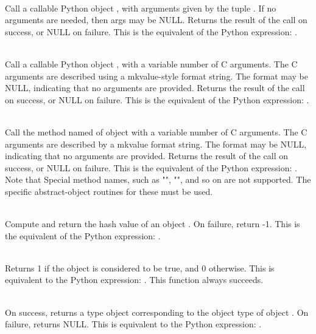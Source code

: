      \\
	 Call a callable Python object , with
	 arguments given by the tuple .  If no arguments are
	 needed, then args may be NULL.  Returns the result of the
	 call on success, or NULL on failure.  This is the equivalent
	 of the Python expression: .

     \\
         Call a callable Python object , with a
         variable number of C arguments. The C arguments are described
         using a mkvalue-style format string. The format may be NULL,
         indicating that no arguments are provided.  Returns the
         result of the call on success, or NULL on failure.  This is
         the equivalent of the Python expression: .


     \\
         Call the method named  of object  with a variable number of
         C arguments.  The C arguments are described by a mkvalue
         format string.  The format may be NULL, indicating that no
         arguments are provided. Returns the result of the call on
         success, or NULL on failure.  This is the equivalent of the
         Python expression: .
         Note that Special method names, such as "",
         "", and so on are not supported. The specific
         abstract-object routines for these must be used.


     \\
         Compute and return the hash value of an object .  On
         failure, return -1.  This is the equivalent of the Python
         expression: .


     \\
	 Returns 1 if the object  is considered to be true, and
	 0 otherwise. This is equivalent to the Python expression:
	 .
	 This function always succeeds.
	 

     \\
	 On success, returns a type object corresponding to the object
	 type of object . On failure, returns NULL.  This is
	 equivalent to the Python expression: .

